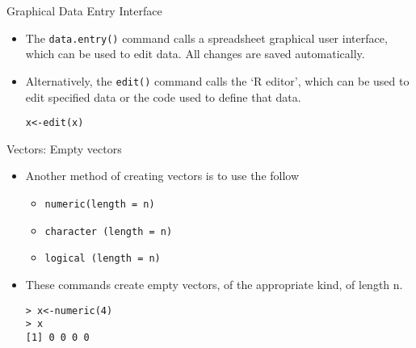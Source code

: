 \begin{frame}[fragile]{Graphical Data Entry Interface}
\begin{itemize}

\item The \texttt{data.entry()} command calls a spreadsheet graphical user
interface, which can be used to edit data. All changes are saved
automatically.




\item Alternatively, the \texttt{edit()} command calls the `R editor',
which can be used to edit specified data or the code used to
define that data.

\begin{verbatim}
x<-edit(x)
\end{verbatim}

\end{itemize}
\end{frame}



\begin{frame}[fragile]{Vectors: Empty vectors}

\begin{itemize}
\item Another method of creating vectors is to use the follow

\begin{itemize}
\item \texttt{numeric(length = n)} 
\item \texttt{character (length = n)} 
\item \texttt{logical (length = n)}
\end{itemize}

\item These commands create empty vectors, of the appropriate
kind, of length n.

\begin{framed}
\begin{verbatim}
> x<-numeric(4)
> x
[1] 0 0 0 0
\end{verbatim}
\end{framed}
\end{itemize}
\end{frame}

